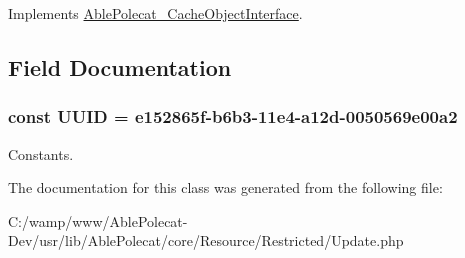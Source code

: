 Implements \hyperlink{interface_able_polecat___cache_object_interface_a3f2135f6ad45f51d075657f6d20db2cd}{Able\+Polecat\+\_\+\+Cache\+Object\+Interface}.



\subsection{Field Documentation}
\hypertarget{class_able_polecat___resource___restricted___update_a74b892c8c0b86bf9d04c5819898c51e7}{}
\subsubsection[{U\+U\+I\+D}]{\setlength{\rightskip}{0pt plus 5cm}const U\+U\+I\+D = \textquotesingle{}e152865f-\/b6b3-\/11e4-\/a12d-\/0050569e00a2\textquotesingle{}}\label{class_able_polecat___resource___restricted___update_a74b892c8c0b86bf9d04c5819898c51e7}
Constants. 

The documentation for this class was generated from the following file\+:\begin{DoxyCompactItemize}
\item 
C\+:/wamp/www/\+Able\+Polecat-\/\+Dev/usr/lib/\+Able\+Polecat/core/\+Resource/\+Restricted/Update.\+php\end{DoxyCompactItemize}
